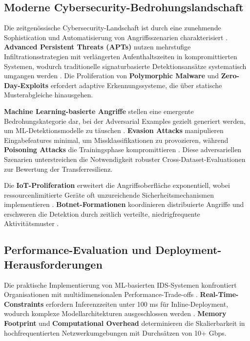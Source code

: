 \documentclass[11pt,a4paper]{article}
\begin{document}
    \subsection{Moderne Cybersecurity-Bedrohungslandschaft}

    Die zeitgenössische Cybersecurity-Landschaft ist durch eine zunehmende Sophistication und Automatisierung von Angriffsszenarien charakterisiert \parencite{GlobalRisksReport2024}. \textbf{Advanced Persistent Threats (APTs)} nutzen mehrstufige Infiltrationsstrategien mit verlängerten Aufenthaltszeiten in kompromittierten Systemen, wodurch traditionelle signaturbasierte Detektionsansätze systematisch umgangen werden \parencite{Ring2019}. Die Proliferation von \textbf{Polymorphic Malware} und \textbf{Zero-Day-Exploits} erfordert adaptive Erkennungssysteme, die über statische Musterabgleiche hinausgehen.

    \textbf{Machine Learning-basierte Angriffe} stellen eine emergente Bedrohungskategorie dar, bei der Adversarial Examples gezielt generiert werden, um ML-Detektionsmodelle zu täuschen \parencite{Goodfellow2016}. \textbf{Evasion Attacks} manipulieren Eingabefeatures minimal, um Missklassifikationen zu provozieren, während \textbf{Poisoning Attacks} die Trainingsphase kompromittieren \parencite{Bishop2006}. Diese adversariellen Szenarien unterstreichen die Notwendigkeit robuster Cross-Dataset-Evaluationen zur Bewertung der Transferresilienz.

    Die \textbf{IoT-Proliferation} erweitert die Angriffsoberfläche exponentiell, wobei ressourcenlimitierte Geräte oft unzureichende Sicherheitsmechanismen implementieren \parencite{Vinayakumar2019}. \textbf{Botnet-Formationen} koordinieren distribuierte Angriffe und erschweren die Detektion durch zeitlich verteilte, niedrigfrequente Aktivitätsmuster \parencite{Sharafaldin2018}.

    \subsection{Performance-Evaluation und Deployment-Herausforderungen}

    Die praktische Implementierung von ML-basierten IDS-Systemen konfrontiert Organisationen mit multidimensionalen Performance-Trade-offs \parencite{Gharib2016}. \textbf{Real-Time-Constraints} erfordern Inferenzzeiten unter 100 ms für Inline-Deployment, wodurch komplexe Modellarchitekturen ausgeschlossen werden \parencite{Belavagi2016}. \textbf{Memory Footprint} und \textbf{Computational Overhead} determinieren die Skalierbarkeit in hochfrequentierten Netzwerkumgebungen mit Durchsätzen von 10+ Gbps.
\end{document}
